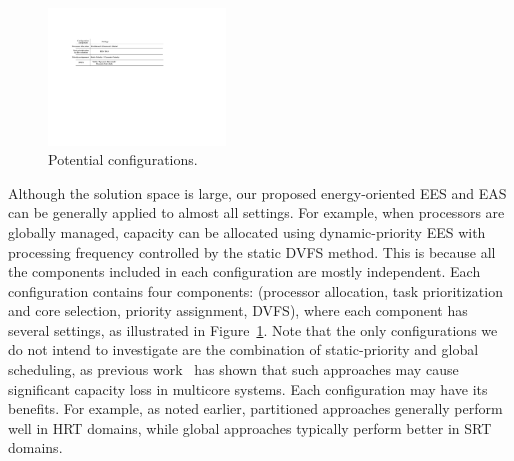 \begin{figure}
\vspace{-2mm}
\centerline{
\includegraphics[width=0.42\textwidth]{images/configurations.pdf}
} \caption{\small Potential configurations.}\normalsize
\label{fig:configurations}
\end{figure}
 Although the solution space is large, our proposed energy-oriented EES and EAS can be generally applied to almost all settings. For example, when processors are globally managed, capacity can be allocated using dynamic-priority EES with processing frequency controlled by the static DVFS method.  This is because all the components included in each configuration are mostly independent. Each configuration contains four components: (processor allocation, task prioritization and core selection, priority assignment, DVFS), where each component has several settings, as illustrated in Figure~\ref{fig:configurations}. Note that the only configurations we do not intend to investigate are the combination of static-priority and global scheduling, as previous work~\cite{bastoni2010empirical} has shown that such approaches may cause significant capacity loss in multicore systems.
  Each configuration may have its benefits. For example, as noted earlier, partitioned approaches generally perform well in HRT domains, while global approaches typically perform better in SRT domains. 
 
 

